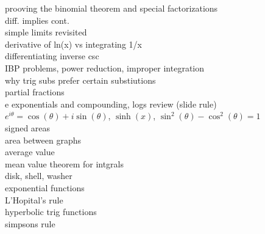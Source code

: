 \documentclass{article}
\begin{document}
prooving the binomial theorem and special factorizations\\
diff. implies cont.\\
simple limits revisited\\
derivative of ln(x) vs integrating 1/x\\
differentiating inverse csc\\
IBP problems, power reduction, improper integration\\
why trig subs prefer certain substiutions\\
partial fractions\\
e exponentials and compounding, logs review (slide rule)\\
$e^{i\theta} = \cos(\theta) + i\sin(\theta)$, $\sinh(x)$, $\sin^2(\theta) - \cos^2(\theta) = 1$\\
signed areas\\
area between graphs\\
average value\\
mean value theorem for intgrals\\
disk, shell, washer\\
exponential functions\\
L'Hopital's rule\\
hyperbolic trig functions\\
simpsons rule\\
\end{document}
